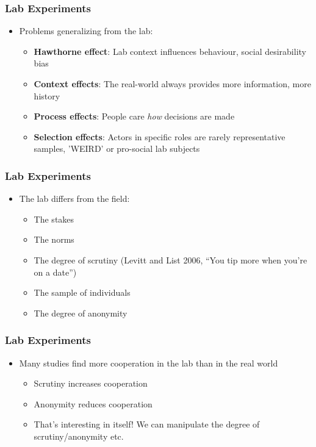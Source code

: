 \documentclass[xcolor=x11names,compress]{beamer}\usepackage[]{graphicx}\usepackage[]{xcolor}
\renewcommand{\(}{\begin{columns}}
\renewcommand{\)}{\end{columns}}
\newcommand{\<}[1]{\begin{column}{#1}}
\renewcommand{\>}{\end{column}}
\begin{document}
\begin{frame}
\frametitle{Lab Experiments}
\begin{itemize}
\item Problems generalizing from the lab:
\pause
\begin{itemize}
\item \textbf{Hawthorne effect}: Lab context influences behaviour, social desirability bias
\pause
\item \textbf{Context effects}: The real-world always provides more information, more history
\pause
\item \textbf{Process effects}: People care \textit{how} decisions are made
\pause
\item \textbf{Selection effects}: Actors in specific roles are rarely representative samples, 'WEIRD' or pro-social lab subjects
\end{itemize}
\end{itemize}
\end{frame}

\begin{frame}
\frametitle{Lab Experiments}
\begin{itemize}
\item The lab differs from the field:
\pause
\begin{itemize}
\item The stakes
\item The norms
\item The degree of scrutiny (Levitt and List 2006, ``You tip more when you're on a date'')
\item The sample of individuals
\item The degree of anonymity
\end{itemize}
\end{itemize}
\end{frame}

\begin{frame}
\frametitle{Lab Experiments}
\begin{itemize}
\item Many studies find more cooperation in the lab than in the real world
\pause
\begin{itemize}
\item Scrutiny increases cooperation
\pause
\item Anonymity reduces cooperation
\pause
\item That's interesting in itself! We can manipulate the degree of scrutiny/anonymity etc.
\end{itemize}
\end{itemize}
\end{frame}
\end{document}
